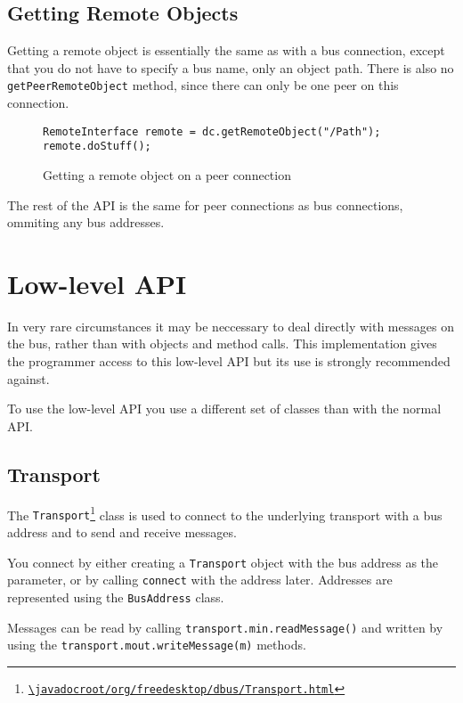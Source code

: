 \documentclass[a4paper,12pt]{article}
\begin{document}
\subsection{Getting Remote Objects}

Getting a remote object is essentially the same as with a bus connection,
except that you do not have to specify a bus name, only an object path. There
is also no {\tt getPeerRemoteObject} method, since there can only be one peer
on this connection.

\begin{figure}[htb]
\begin{center}
\begin{verbatim}
RemoteInterface remote = dc.getRemoteObject("/Path");
remote.doStuff();
\end{verbatim}
\end{center}
\caption{Getting a remote object on a peer connection}
\label{fig:p2premote}
\end{figure}

The rest of the API is the same for peer connections as bus connections,
ommiting any bus addresses.

\section{Low-level API}

In very rare circumstances it may be neccessary to deal directly with messages
on the bus, rather than with objects and method calls. This implementation
gives the programmer access to this low-level API but its use is strongly
recommended against.

To use the low-level API you use a different set of classes than with the
normal API.

\subsection{Transport}

The {\tt Transport\footnote{\url{\javadocroot/org/freedesktop/dbus/Transport.html}}}
class is used to connect to the underlying transport with a bus address and to
send and receive messages. 

You connect by either creating a {\tt Transport} object with the bus address as
the parameter, or by calling {\tt connect} with the address later. Addresses
are represented using the {\tt BusAddress} class.

Messages can be read by calling {\tt transport.min.readMessage()} and written
by using the {\tt transport.mout.writeMessage(m)} methods.
\end{document}
